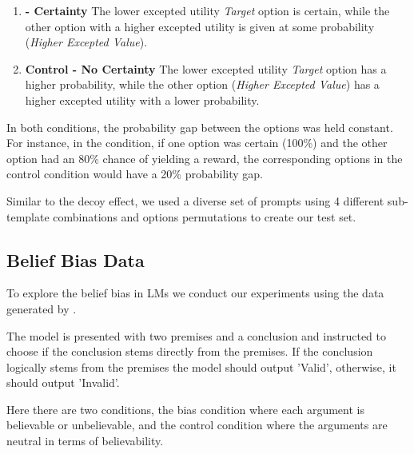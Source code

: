\begin{enumerate}
\item \textbf{\Biaseddataset{} - Certainty} The lower excepted utility \textit{Target} option is certain, while the other option with a higher excepted utility is given at some probability (\textit{Higher Excepted Value}).
\item \textbf{Control - No Certainty} The lower excepted utility \textit{Target} option has a higher probability, while the other option (\textit{Higher Excepted Value})  has a higher excepted utility with a lower probability.
\end{enumerate}

In both conditions, the probability gap between the options was held constant.
For instance, in the \biaseddataset{} condition, if one option was certain (100\%) and the other option had an 80\% chance of yielding a reward, the corresponding options in the control condition would have a 20\% probability gap.

Similar to the decoy effect, we used a diverse set of prompts using 4 different sub-template combinations and options permutations to create our test set.



\subsection{Belief Bias Data}

To explore the belief bias in LMs we conduct our experiments using the data generated by \citet{dasgupta2022language}.

The model is presented with two premises and a conclusion and instructed to choose if the conclusion stems directly from the premises.
If the conclusion logically stems from the premises the model should output 'Valid', otherwise, it should output 'Invalid'.

Here there are two conditions, the bias condition where each argument is believable or unbelievable, and the control condition where the arguments are neutral in terms of believability.


